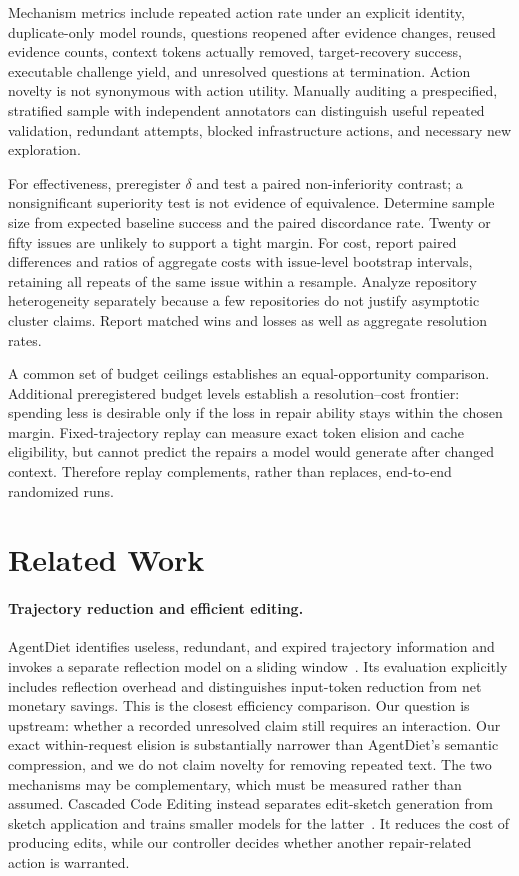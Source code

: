 \documentclass[acmsmall,screen,review,anonymous]{acmart}
\begin{document}
Mechanism metrics include repeated action rate under an explicit identity, duplicate-only model rounds, questions reopened after evidence changes, reused evidence counts, context tokens actually removed, target-recovery success, executable challenge yield, and unresolved questions at termination. Action novelty is not synonymous with action utility. Manually auditing a prespecified, stratified sample with independent annotators can distinguish useful repeated validation, redundant attempts, blocked infrastructure actions, and necessary new exploration.

For effectiveness, preregister $\delta$ and test a paired non-inferiority contrast; a nonsignificant superiority test is not evidence of equivalence. Determine sample size from expected baseline success and the paired discordance rate. Twenty or fifty issues are unlikely to support a tight margin. For cost, report paired differences and ratios of aggregate costs with issue-level bootstrap intervals, retaining all repeats of the same issue within a resample. Analyze repository heterogeneity separately because a few repositories do not justify asymptotic cluster claims. Report matched wins and losses as well as aggregate resolution rates.

A common set of budget ceilings establishes an equal-opportunity comparison. Additional preregistered budget levels establish a resolution--cost frontier: spending less is desirable only if the loss in repair ability stays within the chosen margin. Fixed-trajectory replay can measure exact token elision and cache eligibility, but cannot predict the repairs a model would generate after changed context. Therefore replay complements, rather than replaces, end-to-end randomized runs.

\section{Related Work}
\paragraph{Trajectory reduction and efficient editing.}
AgentDiet identifies useless, redundant, and expired trajectory information and invokes a separate reflection model on a sliding window~\cite{xiao2026agentdiet}. Its evaluation explicitly includes reflection overhead and distinguishes input-token reduction from net monetary savings. This is the closest efficiency comparison. Our question is upstream: whether a recorded unresolved claim still requires an interaction. Our exact within-request elision is substantially narrower than AgentDiet's semantic compression, and we do not claim novelty for removing repeated text. The two mechanisms may be complementary, which must be measured rather than assumed. Cascaded Code Editing instead separates edit-sketch generation from sketch application and trains smaller models for the latter~\cite{wang2026cascade}. It reduces the cost of producing edits, while our controller decides whether another repair-related action is warranted.
\end{document}
